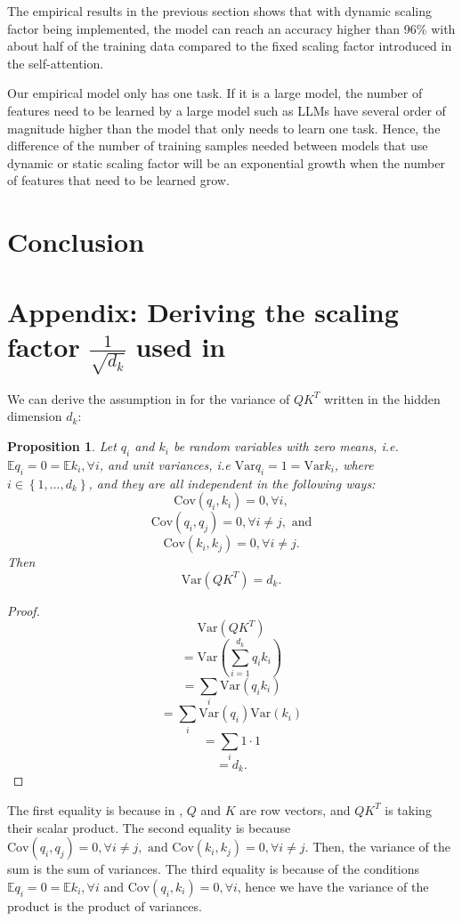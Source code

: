 \documentclass{article}
\theoremstyle{plain}
\theoremstyle{plain} %
\newtheorem{proposition}{Proposition}
\theoremstyle{definition}  %
\theoremstyle{remark}  %
\theoremstyle{plain}
\begin{document}
The empirical results in the previous section shows that with dynamic scaling factor being implemented, the model can reach an accuracy higher than 96\% with about half of the training data compared to the fixed scaling factor introduced in the self-attention.

Our empirical model only has one task. If it is a large model, the number of features need to be learned by a large model such as LLMs have several order of magnitude higher than the model that only needs to learn one task. Hence, the difference of the number of training samples needed between models that use dynamic or static scaling factor will be an exponential growth when the number of features that need to be learned grow. 
\section{Conclusion}

\section{Appendix: Deriving the scaling factor $\frac{1}{\sqrt{d_k}}$ used in \cite{vaswani2017attention}}


We can derive the assumption in \cite{vaswani2017attention} for the variance of $QK^T$ written in the hidden dimension $d_k$:
\begin{proposition}
Let $q_i$ and $k_i$ be random variables with zero means, i.e. $\mathbb{E} q_i=0=\mathbb{E} k_i, \forall i$, and unit variances, i.e $\text{Var} q_i=1=\text{Var}k_i$, where $i\in\left\lbrace 1,...,d_k\right\rbrace$, and they are all independent in the following ways:
$$
\text{Cov}\left( q_i,k_i\right)=0, \forall i,
$$
$$
\text{Cov}\left( q_i,q_j\right)=0, \forall i\neq j, \text{ and}
$$
$$
\text{Cov}\left( k_i,k_j\right)=0, \forall i\neq j.
$$
Then
$$
\text{Var}\left( QK^T\right)=d_k.
$$
\end{proposition}
 
\begin{proof}
$$
\text{Var}\left( QK^T\right)
$$
$$
=\text{Var}\left( \sum\limits_{i=1}^{d_k}q_ik_i\right)
$$
$$
=\sum\limits_i \text{Var}\left( q_ik_i\right)
$$
$$
=\sum\limits_i \text{Var}\left( q_i\right) \text{Var}\left( k_i\right)
$$
$$
=\sum\limits_i 1\cdot 1
$$
$$
=d_k.
$$
\end{proof}
The first equality is because in \cite{vaswani2017attention}, $Q$ and $K$ are row vectors, and $QK^T$ is taking their scalar product. The second equality is because $\text{Cov}\left( q_i,q_j\right)=0, \forall i\neq j, \text{ and } \text{Cov}\left( k_i,k_j\right)=0, \forall i\neq j.$ Then, the variance of the sum is the sum of variances. The third equality is because of the conditions $\mathbb{E} q_i=0=\mathbb{E} k_i, \forall i$ and $\text{Cov}\left( q_i,k_i\right)=0, \forall i$, hence we have the variance of the product is the product of variances.
\end{document}

